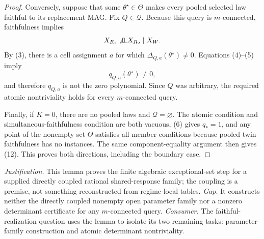 \documentclass{article}
\begin{document}
\begin{proof}
Conversely, suppose that some \(\theta^\star\in\Theta\) makes every pooled selected law faithful to its replacement MAG.  Fix \(Q\in\mathcal Q\).  Because this query is \(m\)-connected, faithfulness implies
\[
 X_{R_1}\not\!\mathbin{\perp\!\!\!\perp}X_{R_2}\mid X_W.
\]
By (3), there is a cell assignment \(a\) for which \(\Delta_{Q,a}(\theta^\star)\ne0\).  Equations (4)--(5) imply
\[
 q_{Q,a}(\theta^\star)\ne0,
 \tag{13}
\]
and therefore \(q_{Q,a}\) is not the zero polynomial.  Since \(Q\) was arbitrary, the required atomic nontriviality holds for every \(m\)-connected query.

Finally, if \(K=0\), there are no pooled laws and \(\mathcal Q=\varnothing\).  The atomic condition and simultaneous-faithfulness condition are both vacuous, (6) gives \(q_*=1\), and any point of the nonempty set \(\Theta\) satisfies all member conditions because pooled twin faithfulness has no instances.  The same component-equality argument then gives (12).  This proves both directions, including the boundary case.
\end{proof}
\par\smallskip\noindent \textit{Justification.} This lemma proves the finite algebraic exceptional-set step for a supplied directly coupled rational shared-response family; the coupling is a premise, not something reconstructed from regime-local tables. \textit{Gap.} It constructs neither the directly coupled nonempty open parameter family nor a nonzero determinant certificate for any \(m\)-connected query. \textit{Consumer.} The faithful-realization question uses the lemma to isolate its two remaining tasks: parameter-family construction and atomic determinant nontriviality.
\end{document}
